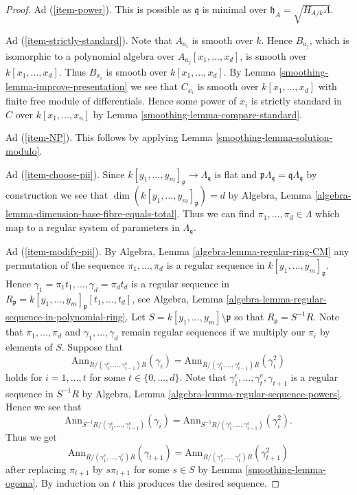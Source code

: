 \begin{proof}
\medskip\noindent
Ad (\ref{item-power}). This is possible as $\mathfrak q$ is minimal
over $\mathfrak h_A = \sqrt{H_{A/k}\Lambda}$.

\medskip\noindent
Ad (\ref{item-strictly-standard}). Note that $A_{a_i}$ is smooth
over $k$. Hence $B_{a_j}$, which is isomorphic to a polynomial
algebra over $A_{a_j}[x_1, \ldots, x_d]$, is smooth over
$k[x_1, \ldots, x_d]$. Thus $B_{x_i}$ is smooth over $k[x_1, \ldots, x_d]$.
By Lemma \ref{smoothing-lemma-improve-presentation}
we see that $C_{x_i}$ is smooth over $k[x_1, \ldots, x_d]$
with finite free module of differentials. Hence some power of
$x_i$ is strictly standard in $C$ over $k[x_1, \ldots, x_n]$
by Lemma \ref{smoothing-lemma-compare-standard}.

\medskip\noindent
Ad (\ref{item-NP}). This follows by applying Lemma \ref{smoothing-lemma-solution-modulo}.

\medskip\noindent
Ad (\ref{item-choose-pii}). Since
$k[y_1, \ldots, y_m]_\mathfrak p \to \Lambda_\mathfrak q$ is
flat and $\mathfrak p \Lambda_\mathfrak q = \mathfrak q \Lambda_\mathfrak q$
by construction
we see that $\dim(k[y_1, \ldots, y_m]_\mathfrak p) = d$ by
Algebra, Lemma \ref{algebra-lemma-dimension-base-fibre-equals-total}.
Thus we can find $\pi_1, \ldots, \pi_d \in \Lambda$ which map to
a regular system of parameters in $\Lambda_\mathfrak q$.

\medskip\noindent
Ad (\ref{item-modify-pii}). By
Algebra, Lemma \ref{algebra-lemma-regular-ring-CM}
any permutation of the sequence $\pi_1, \ldots, \pi_d$ is a
regular sequence in $k[y_1, \ldots, y_m]_\mathfrak p$. Hence
$\gamma_1 = \pi_1 t_1, \ldots, \gamma_d = \pi_d t_d$ is a regular
sequence in
$R_\mathfrak p = k[y_1, \ldots, y_m]_\mathfrak p[t_1, \ldots, t_d]$, see
Algebra, Lemma \ref{algebra-lemma-regular-sequence-in-polynomial-ring}.
Let $S = k[y_1, \ldots, y_m] \setminus \mathfrak p$ so that
$R_\mathfrak p = S^{-1}R$. Note that $\pi_1, \ldots, \pi_d$
and $\gamma_1, \ldots, \gamma_d$
remain regular sequences if we multiply our $\pi_i$ by elements of $S$.
Suppose that
$$
\text{Ann}_{R/(\gamma_1^e, \ldots, \gamma_{i - 1}^e)R}(\gamma_i)
=
\text{Ann}_{R/(\gamma_1^e, \ldots, \gamma_{i - 1}^e)R}(\gamma_i^2)
$$
holds for $i = 1, \ldots, t$ for some $t \in \{0, \ldots, d\}$. Note that
$\gamma_1^e, \ldots, \gamma_t^e, \gamma_{t + 1}$ is a
regular sequence in $S^{-1}R$ by
Algebra, Lemma \ref{algebra-lemma-regular-sequence-powers}.
Hence we see that
$$
\text{Ann}_{S^{-1}R/(\gamma_1^e, \ldots, \gamma_{i - 1}^e)}(\gamma_i) =
\text{Ann}_{S^{-1}R/(\gamma_1^e, \ldots, \gamma_{i - 1}^e)}(\gamma_i^2).
$$
Thus we get
$$
\text{Ann}_{R/(\gamma_1^e, \ldots, \gamma_t^e)R}(\gamma_{t + 1})
=
\text{Ann}_{R/(\gamma_1^e, \ldots, \gamma_t^e)R}(\gamma_{t + 1}^2)
$$
after replacing $\pi_{t + 1}$ by $s\pi_{t + 1}$ for some $s \in S$ by
Lemma \ref{smoothing-lemma-ogoma}. By induction on $t$ this produces the desired
sequence.


\end{proof}
